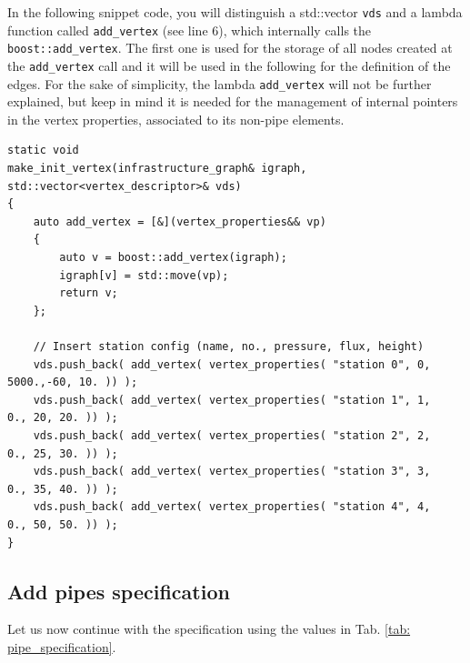 In the following snippet code, you will distinguish a std::vector \texttt{vds} and a lambda function called \texttt{add\_vertex} (see line 6), which internally calls the \texttt{boost::add\_vertex}. The first one is used for the storage of all nodes created at the \texttt{add\_vertex} call  and it will be used in the following for the definition of the edges. For the sake of simplicity, the lambda \texttt{add\_vertex} will not be further explained, but keep in mind it  is needed for the management of internal pointers in the vertex properties, associated to its non-pipe elements. 

\begin{verbatim}
static void
make_init_vertex(infrastructure_graph& igraph, std::vector<vertex_descriptor>& vds)
{
    auto add_vertex = [&](vertex_properties&& vp) 
    {
        auto v = boost::add_vertex(igraph);
        igraph[v] = std::move(vp);
        return v;
    };

    // Insert station config (name, no., pressure, flux, height)
    vds.push_back( add_vertex( vertex_properties( "station 0", 0, 5000.,-60, 10. )) );
    vds.push_back( add_vertex( vertex_properties( "station 1", 1,    0., 20, 20. )) );
    vds.push_back( add_vertex( vertex_properties( "station 2", 2,    0., 25, 30. )) );
    vds.push_back( add_vertex( vertex_properties( "station 3", 3,    0., 35, 40. )) );
    vds.push_back( add_vertex( vertex_properties( "station 4", 4,    0., 50, 50. )) );
}
\end{verbatim}

\subsection{Add pipes specification}
Let us now continue with the  specification using the values in Tab. \ref{tab: pipe_specification}. 


